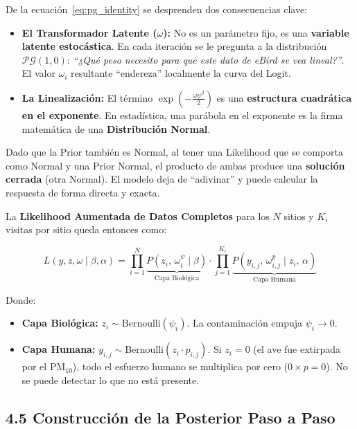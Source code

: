 \documentclass[12pt]{article}
\begin{document}
De la ecuación~\eqref{eq:pg_identity} se desprenden dos consecuencias clave:

\begin{itemize}
  \item \textbf{El Transformador Latente ($\omega$):} No es un parámetro fijo, es una \textbf{variable latente estocástica}. En cada iteración se le pregunta a la distribución $\mathcal{PG}(1,0)$: \textit{``¿Qué peso necesito para que este dato de eBird se vea lineal?''}. El valor $\omega_i$ resultante ``endereza'' localmente la curva del Logit.
  \item \textbf{La Linealización:} El término $\exp\!\left(-\tfrac{\omega\psi^2}{2}\right)$ es una \textbf{estructura cuadrática en el exponente}. En estadística, una parábola en el exponente es la firma matemática de una \textbf{Distribución Normal}.
\end{itemize}

Dado que la Prior también es Normal, al tener una Likelihood que se comporta como Normal y una Prior Normal, el producto de ambas produce una \textbf{solución cerrada} (otra Normal). El modelo deja de ``adivinar'' y puede calcular la respuesta de forma directa y exacta.

\medskip
La \textbf{Likelihood Aumentada de Datos Completos} para los $N$ sitios y $K_i$ visitas por sitio queda entonces como:

\begin{equation}
  L\!\left(y, z, \omega \mid \beta, \alpha\right)
  = \prod_{i=1}^N
    \underbrace{P\!\left(z_i,\, \omega^\psi_i \mid \beta\right)}_{\text{Capa Biológica}}
    \cdot
    \prod_{j=1}^{K_i}
    \underbrace{P\!\left(y_{i,j},\, \omega^p_{i,j} \mid z_i,\, \alpha\right)}_{\text{Capa Humana}}
\end{equation}

Donde:
\begin{itemize}
  \item \textbf{Capa Biológica:} $z_i \sim \text{Bernoulli}(\psi_i)$. La contaminación empuja $\psi_i \to 0$.
  \item \textbf{Capa Humana:} $y_{i,j} \sim \text{Bernoulli}(z_i \cdot p_{i,j})$. Si $z_i = 0$ (el ave fue extirpada por el $\text{PM}_{10}$), todo el esfuerzo humano se multiplica por cero ($0 \times p = 0$). No se puede detectar lo que no está presente.
\end{itemize}

\subsection*{4.5 Construcción de la Posterior Paso a Paso}
\end{document}
